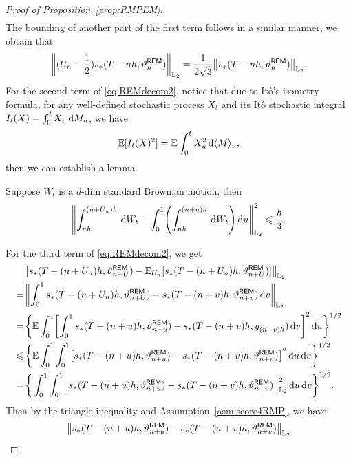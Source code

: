 \begin{proof}[Proof of Proposition~\ref{prop:RMPEM}]
\begin{align*}
\end{align*}
The bounding of another part of the first term follows in a similar manner, we obtain that 
\begin{align*}
    \l|(U_n-\dfrac{1}{2})s_*(T-nh,\vartheta_n^{\sf REM})\r|_{\Ltwo}=\dfrac{1}{2\sqrt{3}}\l|s_*(T-nh,\vartheta_n^{\sf REM})\r|_{\Ltwo}.
\end{align*}
For the second term of \eqref{eq:REMdecom2}, notice that due to It\^o's isometry formula, for any well-defined stochastic process $X_t$ and its It\^o stochastic integral $I_t(X)=\int_0^tX_u{\,\rm d} M_u$, we have
\begin{align}
    \label{eq:Itoiso}
    \mathbb{E}[I_t(X)^2]=\mathbb{E}\int_0^tX_u^2{\,\rm d}\langle M \rangle_u,
\end{align}
then we can establish a lemma.
\begin{lemma}
    \label{lem:Brown1}
    Suppose $W_t$ is a $d$-dim standard Brownian motion, then
    \begin{align*}
        \left\lVert\int_{nh}^{(n+U_n)h}\rmd W_t-\int_0^1\left(\int_{nh}^{(n+u)h}\rmd W_t\right)\rmd u\right\rVert_{\Ltwo}^2\leqslant\dfrac{h}{3}.
    \end{align*}
\end{lemma}
For the third term of \eqref{eq:REMdecom2},  we get
\begin{align*}
    &\left\lVert s_*(T-(n+U_n)h,\vartheta_{n+U}^{\sf REM})-\mathbb{E}_{U_n}[s_*(T-(n+U_n)h,\vartheta_{n+U}^{\sf REM})]\right\rVert_{\Ltwo}\\
    = &\,\left\lVert \int_0^1 s_*(T-(n+U_n)h,\vartheta_{n+U}^{\sf REM})-s_*(T-(n+v)h,\vartheta_{n+v}^{\sf REM})\rmd v\right\rVert_{\Ltwo} \\
    = &\,\bigg\{\mathbb{E}\int_0^1\left[\int_0^1s_*(T-(n+u)h,\vartheta_{n+u}^{\sf REM})-s_*(T-(n+v)h,y_{(n+v)h}^{})\rmd v\right]^2\rmd u\bigg\}^{1/2}\\
    \leqslant &\,\bigg\{\mathbb{E}\int_0^1\int_0^1 \left[s_*(T-(n+u)h,\vartheta_{n+u}^{\sf REM})-s_*(T-(n+v)h,\vartheta_{n+v}^{\sf REM})\right]^2\rmd u\rmd v\bigg\}^{1/2}\\
    = &\,\bigg\{\int_0^1\int_0^1\left\lVert s_*(T-(n+u)h,\vartheta_{n+u}^{\sf REM})-s_*(T-(n+v)h,\vartheta_{n+v}^{\sf REM})\right\rVert_{\Ltwo}^2\rmd u\rmd v\bigg\}^{1/2}.
\end{align*}
Then by the triangle inequality and Assumption~\ref{asm:score4RMP}, we have
\begin{equation}
    \begin{aligned}
        &\left\lVert s_*(T-(n+u)h,\vartheta_{n+u}^{\sf REM})-s_*(T-(n+v)h,\vartheta_{n+v}^{\sf REM})\right\rVert_{\Ltwo}\\

\end{aligned}
\end{equation}
\end{proof}
